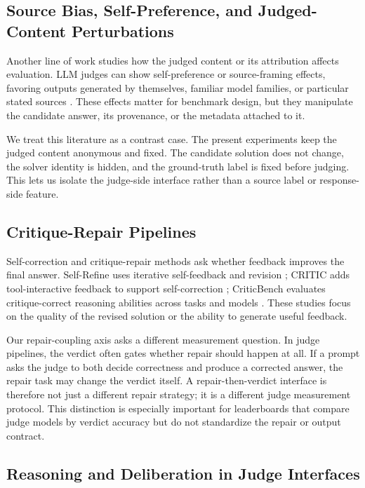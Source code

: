 \documentclass[journal]{IEEEtran}
\begin{document}
\subsection{Source Bias, Self-Preference, and Judged-Content Perturbations}
\label{sec:rw-source}

Another line of work studies how the judged content or its attribution affects evaluation. LLM judges can show self-preference or source-framing effects, favoring outputs generated by themselves, familiar model families, or particular stated sources \citep{panickssery2024selfpreference, wataoka2024selfpreference, germani2025sourceframing}. These effects matter for benchmark design, but they manipulate the candidate answer, its provenance, or the metadata attached to it.

We treat this literature as a contrast case. The present experiments keep the judged content anonymous and fixed. The candidate solution does not change, the solver identity is hidden, and the ground-truth label is fixed before judging. This lets us isolate the judge-side interface rather than a source label or response-side feature.

\subsection{Critique-Repair Pipelines}
\label{sec:rw-pipelines}

Self-correction and critique-repair methods ask whether feedback improves the final answer. Self-Refine uses iterative self-feedback and revision \citep{madaan2023selfrefine}; CRITIC adds tool-interactive feedback to support self-correction \citep{gou2024critic}; CriticBench evaluates critique-correct reasoning abilities across tasks and models \citep{lin2024criticbench}. These studies focus on the quality of the revised solution or the ability to generate useful feedback.

Our repair-coupling axis asks a different measurement question. In judge pipelines, the verdict often gates whether repair should happen at all. If a prompt asks the judge to both decide correctness and produce a corrected answer, the repair task may change the verdict itself. A repair-then-verdict interface is therefore not just a different repair strategy; it is a different judge measurement protocol. This distinction is especially important for leaderboards that compare judge models by verdict accuracy but do not standardize the repair or output contract.

\subsection{Reasoning and Deliberation in Judge Interfaces}
\label{sec:rw-deliberation}
\end{document}

